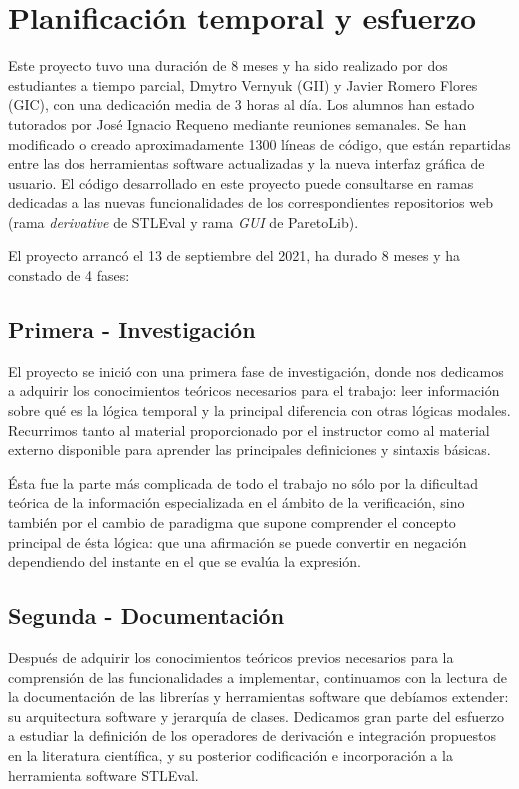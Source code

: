 \section{Planificación temporal y esfuerzo}

Este proyecto tuvo una duración de 8 meses y ha sido realizado por dos estudiantes a tiempo parcial, Dmytro Vernyuk (GII) y Javier Romero Flores (GIC), con una dedicación media de 3 horas al día. Los alumnos han estado tutorados por José Ignacio Requeno mediante reuniones semanales. Se han modificado o creado aproximadamente 1300 líneas de código, que están repartidas entre las dos herramientas software actualizadas y la nueva interfaz gráfica de usuario. El código desarrollado en este proyecto puede consultarse en ramas dedicadas a las nuevas funcionalidades de los correspondientes repositorios web (rama \textit{derivative} de STLEval y rama \textit{GUI} de ParetoLib).

El proyecto arrancó el 13 de septiembre del 2021, ha durado 8 meses y ha constado de 4 fases: 

\subsection{Primera - Investigación}
El proyecto se inició con una primera fase de investigación, donde nos dedicamos a adquirir los conocimientos teóricos necesarios para el trabajo: leer información sobre qué es la lógica temporal y la principal diferencia con otras lógicas modales. Recurrimos tanto al material proporcionado por el instructor como al material externo disponible para aprender las principales definiciones y sintaxis básicas. 

Ésta fue la parte más complicada de todo el trabajo no sólo por la dificultad teórica de la información especializada en el ámbito de la verificación, sino también por el cambio de paradigma que supone comprender el concepto principal de ésta lógica: que una afirmación se puede convertir en negación dependiendo del instante en el que se evalúa la expresión.
	
\subsection{Segunda - Documentación}

	Después de adquirir los conocimientos teóricos previos necesarios para la comprensión de las funcionalidades a implementar, continuamos con la lectura de la documentación de las librerías y herramientas software que debíamos extender: su arquitectura software y jerarquía de clases. Dedicamos gran parte del esfuerzo a estudiar la definición de los operadores de derivación e integración propuestos en la literatura científica, y su posterior codificación e incorporación a la herramienta software STLEval.
	
